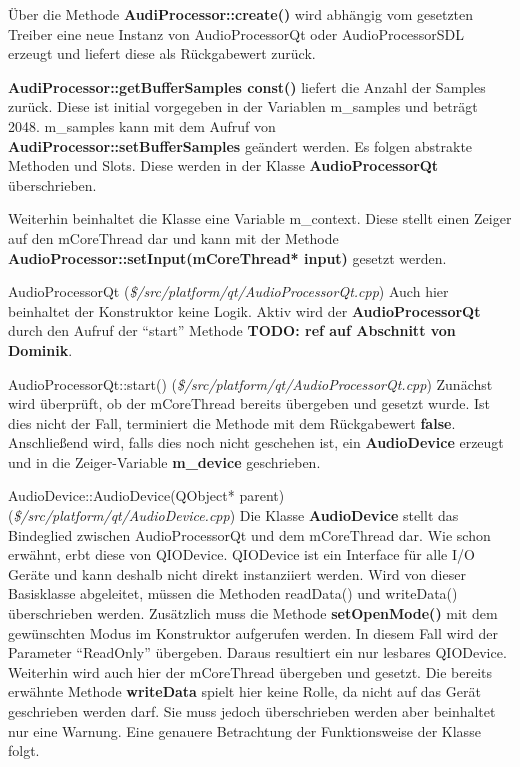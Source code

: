 \documentclass[11pt,a4paper]{scrartcl}
\begin{document}
\"Uber die Methode \textbf{AudiProcessor::create()} wird abh\"angig vom gesetzten Treiber eine neue Instanz von AudioProcessorQt oder AudioProcessorSDL erzeugt und liefert diese als R\"uckgabewert zur\"uck.

\textbf{AudiProcessor::getBufferSamples const()} liefert die Anzahl der Samples zur\"uck. Diese ist initial vorgegeben in der Variablen m\_samples und betr\"agt 2048. m\_samples kann mit dem Aufruf von \textbf{AudiProcessor::setBufferSamples} ge\"andert werden. Es folgen abstrakte Methoden und Slots. Diese werden in der Klasse 
\textbf{AudioProcessorQt} \"uberschrieben.

Weiterhin beinhaltet die Klasse eine Variable m\_context. Diese stellt einen Zeiger auf den mCoreThread dar und kann mit der Methode \textbf{AudioProcessor::setInput(mCoreThread* input)} gesetzt werden. 

\vspace{5mm}
\large AudioProcessorQt \normalsize(\textit{\$/src/platform/qt/AudioProcessorQt.cpp})
\vspace{2mm}\newline
Auch hier beinhaltet der Konstruktor keine Logik. Aktiv wird der \textbf{AudioProcessorQt} durch den Aufruf der "`start"' Methode \textbf{TODO: ref auf Abschnitt von Dominik}.

\vspace{5mm}
\large AudioProcessorQt::start() \normalsize(\textit{\$/src/platform/qt/AudioProcessorQt.cpp})
\vspace{2mm}\newline
Zun\"achst wird \"uberpr\"uft, ob der mCoreThread bereits \"ubergeben und gesetzt wurde. Ist dies nicht der Fall, terminiert die Methode mit dem R\"uckgabewert \textbf{false}. Anschlie{\ss}end wird, falls dies noch nicht geschehen ist, ein
\textbf{AudioDevice} erzeugt und in die Zeiger-Variable \textbf{m\_device} geschrieben.

\vspace{5mm}
\large AudioDevice::AudioDevice(QObject* parent) \normalsize(\textit{\$/src/platform/qt/AudioDevice.cpp})
\vspace{2mm}\newline
Die Klasse \textbf{AudioDevice} stellt das Bindeglied zwischen AudioProcessorQt und dem mCoreThread dar. Wie schon erw\"ahnt, erbt diese von QIODevice. QIODevice ist ein Interface f\"ur alle I/O Ger\"ate und kann deshalb nicht direkt instanziiert werden.
Wird von dieser Basisklasse abgeleitet, m\"ussen die Methoden readData() und writeData() \"uberschrieben werden. Zus\"atzlich muss die Methode \textbf{setOpenMode()} mit dem gew\"unschten Modus im Konstruktor aufgerufen werden. In diesem Fall wird der Parameter "`ReadOnly"' \"ubergeben. Daraus resultiert ein nur lesbares QIODevice. Weiterhin wird auch hier der mCoreThread \"ubergeben und gesetzt. Die bereits erw\"ahnte Methode \textbf{writeData} spielt hier keine Rolle, da nicht auf das Ger\"at geschrieben werden darf. Sie muss jedoch \"uberschrieben werden aber beinhaltet nur eine Warnung. Eine genauere Betrachtung der Funktionsweise der Klasse folgt. 
\end{document}
